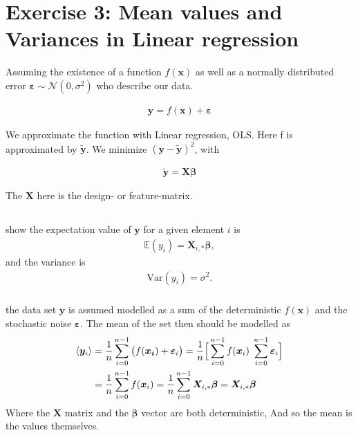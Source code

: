 \documentclass[10pt]{revtex4-2}
\begin{document}
\section{Exercise 3: Mean values and Variances in Linear regression}

Assuming the existence of a function $f(\bm{x})$ as well as a normally distributed error 
$\bm{\varepsilon} \sim \mathcal{N}(0, \sigma^2)$ who describe our data. 

\begin{align}
	\bm{y} = f(\bm{x}) + \bm{\varepsilon}
\end{align}

We approximate the function with Linear regression, OLS. Here f is approximated by 
$\bm{\tilde{y}}$. We minimize $(\bm{y} - \bm{\tilde{y}})^2$, with

\begin{align}
	\bm{\tilde{y}} = \bm{X}\bm{\beta}
\end{align}

The $\bm{X}$ here is the design- or feature-matrix.

\subsection{}
show the expectation value of $\bm{y}$ for a given element $i$ is 
\begin{align}
	\mathbb{E}(y_i) = \bm{X}_{i,*}\bm{\beta}, 
\end{align}
and the variance is
\begin{align}
	\mbox{Var}(y_i) = \sigma^2.
\end{align}
\subsubsection{}
the data set $\bm{y}$ is assumed modelled as a sum of the deterministic $f(\bm{x})$ and 
the stochastic noise $\bm{\varepsilon}$. The mean of the set then should be modelled as 
\begin{align}
	\expval{\bm{y}_i} &= \frac{1}{n}\sum_{i=0}^{n-1} \big( f(\bm{x_i}) + \bm{\varepsilon}_i \big)
		= \frac{1}{n} \Big[ \sum_{i=0}^{n-1} f(\bm{x}_i) \; \sum_{i=0}^{n-1} \bm{\varepsilon}_i
			\Big] \\
	 &= \frac{1}{n} \sum_{i=0}^{n-1} f(\bm{x}_i) 
		= \frac{1}{n} \sum_{i=0}^{n-1} \bm{X}_{i,*}\bm{\beta} =\bm{X}_{i,*}\bm{\beta}
\end{align}
Where the $\bm{X}$  matrix and the  $\bm{\beta}$ vector are both deterministic,
And so the mean is the values themselves. 
\end{document}
